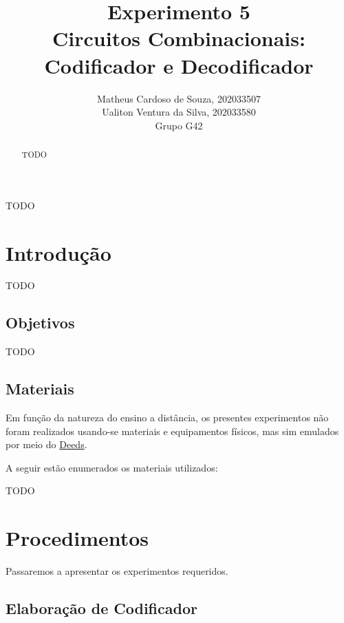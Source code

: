 \documentclass[12pt]{article}
\title{Experimento 5\\
Circuitos Combinacionais: Codificador e Decodificador}
\author{Matheus Cardoso de Souza, 202033507\\
        Ualiton Ventura da Silva, 202033580\\
        Grupo G42
}
\begin{document}
\maketitle

 \begin{abstract}
   TODO
 \end{abstract}

 \begin{resumo}
   TODO
 \end{resumo}


\section{Introdução}
\label{sec:Introducao}


TODO

\subsection{Objetivos}
\label{sec:Objetivos}

TODO

\subsection{Materiais}
\label{sec:Materiais}
Em função da natureza do ensino a distância, os presentes experimentos não foram
realizados usando-se materiais e equipamentos físicos, mas sim emulados por meio
do \href{https://www.digitalelectronicsdeeds.com/deeds.html}{Deeds}.

A seguir estão enumerados os materiais utilizados:
\begin{itemize}
        TODO
\end{itemize}

\section{Procedimentos}
\label{sec:Procedimentos}

Passaremos a apresentar os experimentos requeridos.

\subsection{Elaboração de Codificador}\label{sec:elaboração_codificador}
\end{document}
